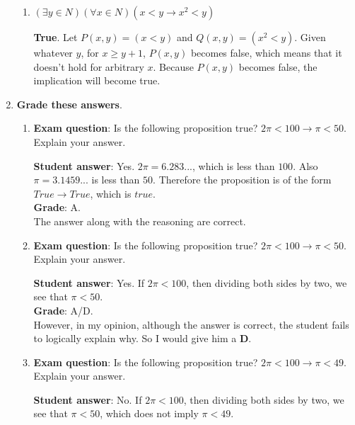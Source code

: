\documentclass[11pt]{article}
\begin{document}
\begin{enumerate}
\begin{enumerate}
			\item $(\exists y \in N)(\forall x \in N) (x < y \rightarrow x^2 < y)$
			
			\textbf{True}. Let $P(x, y) = (x < y)$ and $Q(x, y) = (x^2 < y)$. Given whatever $y$, for $x \ge y + 1$, $P(x, y)$ becomes false, which means that it doesn't hold for arbitrary $x$. Because $P(x, y)$ becomes false, the implication will become true. \\
			
			
		\end{enumerate}
	
		\item \textbf{Grade these answers}. 
		
		\begin{enumerate}
			
			\item \textbf{Exam question}: Is the following proposition true? $2\pi < 100 \rightarrow \pi < 50$. Explain your answer.
			
			\textbf{Student answer}: Yes. $2\pi = 6.283...$, which is less than $100$. Also $\pi = 3.1459...$ is less than $50$.
			Therefore the proposition is of the form $True \rightarrow True$, which is $true$.\\
			
			\textbf{Grade}: A. \\The answer along with the reasoning are correct. \\
			
			\item \textbf{Exam question}: Is the following proposition true? $2\pi < 100 \rightarrow \pi < 50$. Explain your answer.
			
			\textbf{Student answer}: Yes. If $2\pi < 100$, then dividing both sides by two, we see that $\pi < 50$. \\
			
			\textbf{Grade}: A/D. \\ However, in my opinion, although the answer is correct, the student fails to logically explain why. So I would give him a \textbf{D}. \\
			
			\item \textbf{Exam question}: Is the following proposition true? $2\pi < 100 \rightarrow \pi < 49.$ Explain your answer.
			
			\textbf{Student answer}: No. If $2\pi < 100$, then dividing both sides by two, we see that $\pi < 50$, which does
			not imply $\pi < 49$.\\
			

\end{enumerate}
\end{enumerate}
\end{document}
